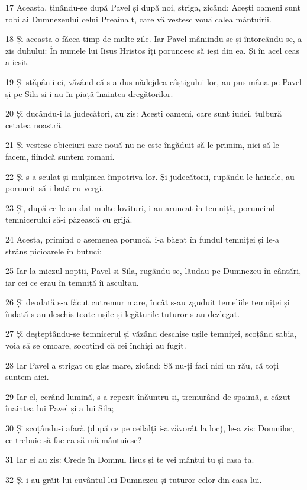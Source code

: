 \par 17 Aceasta, ținându-se după Pavel și după noi, striga, zicând: Acești oameni sunt robi ai Dumnezeului celui Preaînalt, care vă vestesc vouă calea mântuirii.
\par 18 Și aceasta o făcea timp de multe zile. Iar Pavel mâniindu-se și întorcându-se, a zis duhului: În numele lui Iisus Hristos îți poruncesc să ieși din ea. Și în acel ceas a ieșit.
\par 19 Și stăpânii ei, văzând că s-a dus nădejdea câștigului lor, au pus mâna pe Pavel și pe Sila și i-au în piață înaintea dregătorilor.
\par 20 Și ducându-i la judecători, au zis: Acești oameni, care sunt iudei, tulbură cetatea noastră.
\par 21 Și vestesc obiceiuri care nouă nu ne este îngăduit să le primim, nici să le facem, fiindcă suntem romani.
\par 22 Și s-a sculat și mulțimea împotriva lor. Și judecătorii, rupându-le hainele, au poruncit să-i bată cu vergi.
\par 23 Și, după ce le-au dat multe lovituri, i-au aruncat în temniță, poruncind temnicerului să-i păzească cu grijă.
\par 24 Acesta, primind o asemenea poruncă, i-a băgat în fundul temniței și le-a strâns picioarele în butuci;
\par 25 Iar la miezul nopții, Pavel și Sila, rugându-se, lăudau pe Dumnezeu în cântări, iar cei ce erau în temniță îi ascultau.
\par 26 Și deodată s-a făcut cutremur mare, încât s-au zguduit temeliile temniței și îndată s-au deschis toate ușile și legăturile tuturor s-au dezlegat.
\par 27 Și deșteptându-se temnicerul și văzând deschise ușile temniței, scoțând sabia, voia să se omoare, socotind că cei închiși au fugit.
\par 28 Iar Pavel a strigat cu glas mare, zicând: Să nu-ți faci nici un rău, că toți suntem aici.
\par 29 Iar el, cerând lumină, s-a repezit înăuntru și, tremurând de spaimă, a căzut înaintea lui Pavel și a lui Sila;
\par 30 Și scoțându-i afară (după ce pe ceilalți i-a zăvorât la loc), le-a zis: Domnilor, ce trebuie să fac ca să mă mântuiesc?
\par 31 Iar ei au zis: Crede în Domnul Iisus și te vei mântui tu și casa ta.
\par 32 Și i-au grăit lui cuvântul lui Dumnezeu și tuturor celor din casa lui.
